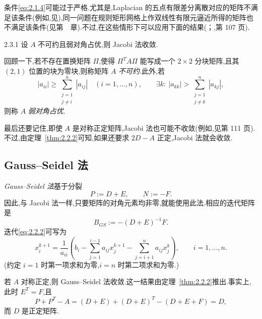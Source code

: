 条件\eqref{eq:2.1.4}可能过于严格.尤其是,Laplacian 的五点有限差分离散对应的矩阵不满足该条件(例如,见),同一问题在规则矩形网格上作双线性有限元逼近所得的矩阵也不满足该条件(见第~~章).不过,在这些情形下可以应用下面的结果(；,第 107 页).

\begin{theorem}[]{2.3.1}
设 \(A\) 不可约且弱对角占优,则 Jacobi 法收敛.
\end{theorem}

回顾一下,若不存在置换矩阵 \(\Pi\),使得 \(\Pi^TA\Pi\) 能写成一个 \(2\times2\) 分块矩阵,且其 \((2,1)\) 位置的块为零块,则称矩阵 \(A\) \emph{不可约}.此外,若
\begin{equation}\label{eq:2.3.5}
  |a_{ii}|\ge\sum_{\substack{j=1\\j\ne i}}^n|a_{ij}|
  \quad (i=1,\ldots,n),\qquad
  \exists k:\ |a_{kk}|>\sum_{\substack{j=1\\j\ne k}}^n|a_{kj}|,
\end{equation}
则称 \(A\) \emph{弱对角占优}.

最后还要记住,即使 \(A\) 是对称正定矩阵,Jacobi 法也可能不收敛(例如,见第 111 页).不过,由定理~\ref{thm:2.2.2}可知,如果还要求 \(2D-A\) 正定,Jacobi 法就会收敛.

\subsection{Gauss--Seidel 法}\label{sec:2.3.2}

\emph{Gauss--Seidel 法}基于分裂
\begin{equation}\label{eq:2.3.6}
  P:=D+E,\qquad N:=-F.
\end{equation}
因此,与 Jacobi 法一样,只要矩阵的对角元素均非零,就能使用此法.相应的迭代矩阵是
\[
  B_{GS}:=-(D+E)^{-1}F.
\]
迭代\eqref{eq:2.2.2}可写为
\begin{equation}\label{eq:2.3.7}
  x_i^{k+1}=\frac1{a_{ii}}\left(
    b_i-\sum_{j=1}^{i-1}a_{ij}x_j^{k+1}-\sum_{j=i+1}^{n}a_{ij}x_j^k
    \right),\qquad i=1,\ldots,n.
\end{equation}
(约定 \(i=1\) 时第一项求和为零,\(i=n\) 时第二项求和为零.)

若 \(A\) 对称正定,则 Gauss--Seidel 法收敛.这一结果由定理~\ref{thm:2.2.2}推出.事实上,此时 \(E^T=F\),且
\begin{equation}\label{eq:2.3.8}
  P+P^T-A=(D+E)+(D+E)^T-(D+E+F)=D,
\end{equation}
而 \(D\) 是正定矩阵.

